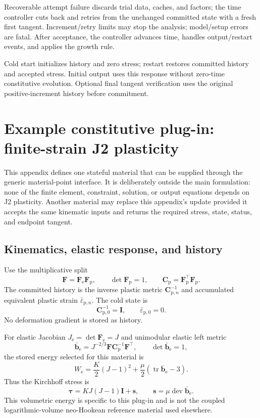 \documentclass[11pt,a4paper]{article}
\newcommand{\bs}[1]{\boldsymbol{#1}}
\newcommand{\tr}{\operatorname{tr}}
\newcommand{\dev}{\operatorname{dev}}
\newcommand{\I}{\bs{I}}
\newcommand{\F}{\bs{F}}
\newcommand{\Fe}{\bs{F}_{\mathrm e}}
\newcommand{\Fp}{\bs{F}_{\mathrm p}}
\newcommand{\tauK}{\bs{\tau}}
\begin{document}
Recoverable attempt failure discards trial data, caches, and factors; the time controller cuts back and retries from the unchanged committed state with a fresh first tangent. Increment/retry limits may stop the analysis; model/setup errors are fatal. After acceptance, the controller advances time, handles output/restart events, and applies the growth rule.

Cold start initializes history and zero stress; restart restores committed history and accepted stress. Initial output uses this response without zero-time constitutive evolution. Optional final tangent verification uses the original positive-increment history before commitment.

\appendix
\section{Example constitutive plug-in: finite-strain J2 plasticity}
\label{app:j2-plasticity}

This appendix defines one stateful material that can be supplied through the generic material-point interface.  It is deliberately outside the main formulation: none of the finite element, constraint, solution, or output equations depends on J2 plasticity.  Another material may replace this appendix's update provided it accepts the same kinematic inputs and returns the required stress, state, status, and endpoint tangent.

\subsection{Kinematics, elastic response, and history}

Use the multiplicative split
\begin{equation}
\F=\Fe\Fp,
\qquad
\det\Fp=1,
\qquad
\bs C_{\mathrm p}=\Fp^\top\Fp.
\end{equation}
The committed history is the inverse plastic metric $\bs C_{\mathrm p,n}^{-1}$ and accumulated equivalent plastic strain $\bar\varepsilon_{\mathrm p,n}$.  The cold state is
\begin{equation}
\bs C_{\mathrm p,0}^{-1}=\I,
\qquad
\bar\varepsilon_{\mathrm p,0}=0.
\end{equation}
No deformation gradient is stored as history.

For elastic Jacobian $J_{\mathrm e}=\det\Fe=J$ and unimodular elastic left metric
\begin{equation}
\bar{\bs b}_{\mathrm e}=J^{-2/3}\F\bs C_{\mathrm p}^{-1}\F^\top,
\qquad \det\bar{\bs b}_{\mathrm e}=1,
\end{equation}
the stored energy selected for this material is
\begin{equation}
W_{\mathrm e}
=\frac{K}{2}(J-1)^2
+\frac{\mu}{2}\left(\tr\bar{\bs b}_{\mathrm e}-3\right).
\label{eq:j2-energy}
\end{equation}
Thus the Kirchhoff stress is
\begin{equation}
\tauK=KJ(J-1)\I+\bs s,
\qquad
\bs s=\mu\dev\bar{\bs b}_{\mathrm e}.
\label{eq:j2-kirchhoff}
\end{equation}
This volumetric energy is specific to this plug-in and is not the coupled logarithmic-volume neo-Hookean reference material used elsewhere.
\end{document}
